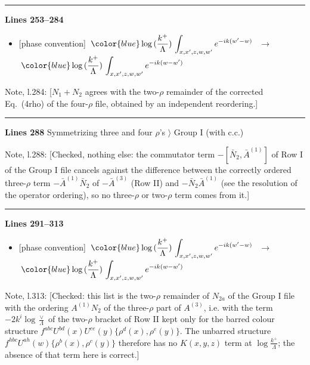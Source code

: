 \documentclass[10pt]{article}
\newenvironment{notebox}{\def\FrameCommand{{\color{notebar}\vrule width 1.5pt}\hspace{6pt}}\MakeFramed{\advance\hsize-\width\FrameRestore}\small}{\endMakeFramed}
\begin{document}
\noindent\rule{\linewidth}{0.3pt}\par\noindent\textbf{Lines 253--284} \par
\begin{itemize}[leftmargin=2.2em,itemsep=1pt,topsep=2pt]
\item[\textbf{l.253}] \textsf{\small [phase convention]} $\displaystyle \,{\color{blue}\log{(\frac{k^{+}}{\Lambda})}}\,\int_{x,x',z,w,w'}e^{-ik(w'-w)}\,$\ $\longrightarrow$\ $\displaystyle \,{\color{blue}\log{(\frac{k^{+}}{\Lambda})}}\,\int_{x,x',z,w,w'}e^{-ik(w-w')}\,$
\end{itemize}
\begin{notebox}\textsf{\small Note, l.284:} [$N_{1}+N_{2}$ agrees with the two-$\rho$ remainder of the corrected Eq.~(4rho) of the four-$\rho$ file, obtained by an independent reordering.]\end{notebox}
\noindent\rule{\linewidth}{0.3pt}\par\noindent\textbf{Lines 288} \quad \textsf{Symmetrizing three and four $\rho$'s $\rangle$ Group I (with c.c.)}\par
\begin{notebox}\textsf{\small Note, l.288:} [Checked, nothing else: the commutator term $-[\bar N_{2},\bar A^{(1)}]$ of Row I of the Group I file cancels against the difference between the correctly ordered three-$\rho$ term $-\bar A^{(1)}\bar N_{2}$ of $-\bar A^{(3)}$ (Row II) and $-\bar N_{2}\bar A^{(1)}$ (see the resolution of the operator ordering), so no three-$\rho$ or two-$\rho$ term comes from it.]\end{notebox}
\noindent\rule{\linewidth}{0.3pt}\par\noindent\textbf{Lines 291--313} \par
\begin{itemize}[leftmargin=2.2em,itemsep=1pt,topsep=2pt]
\item[\textbf{l.291}] \textsf{\small [phase convention]} $\displaystyle \,{\color{blue}\log{(\frac{k^{+}}{\Lambda})}}\,\int_{x,x',z,w,w'}e^{-ik(w'-w)}\,$\ $\longrightarrow$\ $\displaystyle \,{\color{blue}\log{(\frac{k^{+}}{\Lambda})}}\,\int_{x,x',z,w,w'}e^{-ik(w-w')}\,$
\end{itemize}
\begin{notebox}\textsf{\small Note, l.313:} [Checked: this list is the two-$\rho$ remainder of $N_{2a}$ of the Group I file with the ordering $A^{(1)}N_{2}$ of the three-$\rho$ part of $A^{(3)}$, i.e. with the term $-2k^{i}\log\frac{\vee}{\Lambda}$ of the two-$\rho$ bracket of Row II kept only for the barred colour structure $f^{abc}U^{bd}(x)U^{ce}(y)\{\rho^{d}(x),\rho^{e}(y)\}$. The unbarred structure $f^{hbc}U^{ah}(w)\{\rho^{b}(x),\rho^{c}(y)\}$ therefore has no $K(x,y,z)$ term at $\log\frac{k^{+}}{\Lambda}$; the absence of that term here is correct.]\end{notebox}
\end{document}
